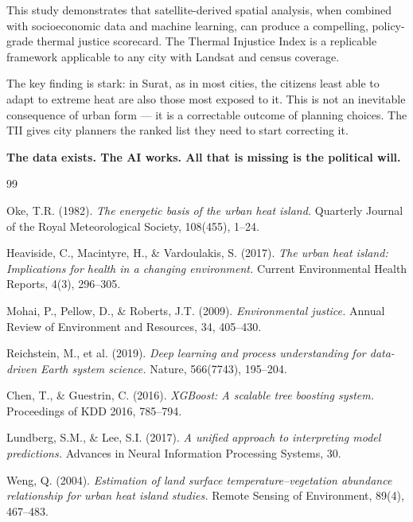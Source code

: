 \documentclass[12pt, a4paper]{article}
\begin{document}
This study demonstrates that satellite-derived spatial analysis, when combined
with socioeconomic data and machine learning, can produce a compelling,
policy-grade thermal justice scorecard. The Thermal Injustice Index is a
replicable framework applicable to any city with Landsat and census coverage.

The key finding is stark: in Surat, as in most cities, the citizens least
able to adapt to extreme heat are also those most exposed to it. This is not
an inevitable consequence of urban form — it is a correctable outcome of
planning choices. The TII gives city planners the ranked list they need to
start correcting it.

\textbf{The data exists. The AI works. All that is missing is the political will.}

\newpage

\begin{thebibliography}{99}

Oke, T.R. (1982).
\textit{The energetic basis of the urban heat island.}
Quarterly Journal of the Royal Meteorological Society, 108(455), 1--24.

Heaviside, C., Macintyre, H., \& Vardoulakis, S. (2017).
\textit{The urban heat island: Implications for health in a changing environment.}
Current Environmental Health Reports, 4(3), 296--305.

Mohai, P., Pellow, D., \& Roberts, J.T. (2009).
\textit{Environmental justice.}
Annual Review of Environment and Resources, 34, 405--430.

Reichstein, M., et al. (2019).
\textit{Deep learning and process understanding for data-driven Earth system science.}
Nature, 566(7743), 195--204.

Chen, T., \& Guestrin, C. (2016).
\textit{XGBoost: A scalable tree boosting system.}
Proceedings of KDD 2016, 785--794.

Lundberg, S.M., \& Lee, S.I. (2017).
\textit{A unified approach to interpreting model predictions.}
Advances in Neural Information Processing Systems, 30.

Weng, Q. (2004).
\textit{Estimation of land surface temperature–vegetation abundance relationship for urban heat island studies.}
Remote Sensing of Environment, 89(4), 467--483.

\end{thebibliography}
\end{document}
